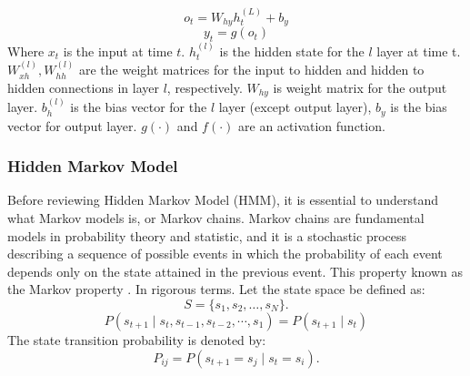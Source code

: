 \documentclass[12pt,a4paper]{article}
\begin{document}
\begin{equation}
    o_t = W_{hy}h^{(L)}_{t} + b_y
\end{equation}
\begin{equation}
    y_t = g(o_t)
\end{equation}
Where $x_t$ is the input at time $t$. $h^{(l)}_{t}$ is the hidden state for the $l$ layer at time t. $W^{(l)}_{xh}, W^{(l)}_{hh}$ are the weight matrices for the input to hidden and hidden to hidden connections in layer $l$, respectively. $W_{hy}$ is weight matrix for the output layer. $b^{(l)}_h$ is the bias vector for the $l$ layer (except output layer), $b_y$ is the bias vector for output layer. $g(\cdot)$ and $f(\cdot)$ are an activation function. 

\subsubsection{Hidden Markov Model}
Before reviewing Hidden Markov Model (HMM), it is essential to understand what Markov models is, or Markov chains. Markov chains are fundamental models in probability theory and statistic, and it is a stochastic process describing a sequence of possible events in which the probability of each event depends only on the state attained in the previous event. This property known as the Markov property \parencite{roberts2004general, rabiner1986anintroduction}. In rigorous terms. Let the state space be defined as:
\begin{equation}
    S = \{ s_1, s_2, \dots, s_N \}.
\end{equation}
\begin{equation}
    P(s_{t+1} \mid s_t, s_{t-1}, s_{t-2}, \cdots, s_{1}) = P(s_{t+1} \mid s_t)
\end{equation}
The state transition probability is denoted by:
\begin{equation}
    P_{ij} = P(s_{t+1} = s_j \mid s_t = s_i).
\end{equation}
\end{document}
